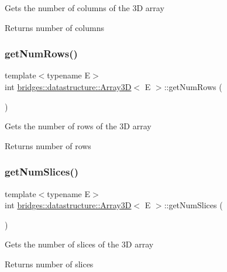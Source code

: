 Gets the number of columns of the 3D array \begin{DoxyReturn}{Returns}
number of columns 
\end{DoxyReturn}
\mbox{\label{classbridges_1_1datastructure_1_1_array3_d_a73aebe1098512ca4196cb8da0eb493fe}} 
\subsubsection{\texorpdfstring{getNumRows()}{getNumRows()}}
{\footnotesize\ttfamily template$<$typename E$>$ \\
int \mbox{\hyperlink{classbridges_1_1datastructure_1_1_array3_d}{bridges\+::datastructure\+::\+Array3D}}$<$ E $>$\+::get\+Num\+Rows (\begin{DoxyParamCaption}{ }\end{DoxyParamCaption})\hspace{0.3cm}{\ttfamily [inline]}}

Gets the number of rows of the 3D array \begin{DoxyReturn}{Returns}
number of rows 
\end{DoxyReturn}
\mbox{\label{classbridges_1_1datastructure_1_1_array3_d_ad2fb0a0b8be702944c25b6fc807263f7}} 
\subsubsection{\texorpdfstring{getNumSlices()}{getNumSlices()}}
{\footnotesize\ttfamily template$<$typename E$>$ \\
int \mbox{\hyperlink{classbridges_1_1datastructure_1_1_array3_d}{bridges\+::datastructure\+::\+Array3D}}$<$ E $>$\+::get\+Num\+Slices (\begin{DoxyParamCaption}{ }\end{DoxyParamCaption})\hspace{0.3cm}{\ttfamily [inline]}}

Gets the number of slices of the 3D array \begin{DoxyReturn}{Returns}
number of slices 
\end{DoxyReturn}
\mbox{\label{classbridges_1_1datastructure_1_1_array3_d_a0b285b00e5d152d2968bee6b3aaf9349}} 
